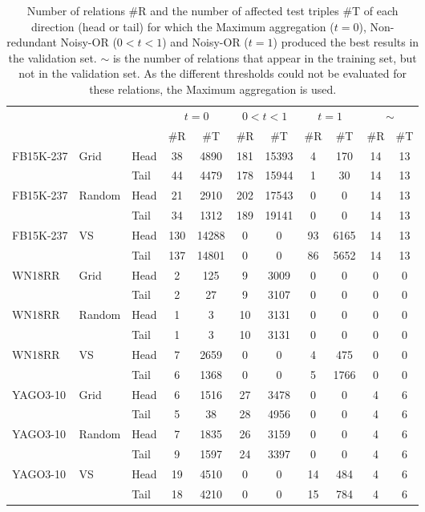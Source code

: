 \documentclass[akbc,twoside,11pt,lettersize]{article}
\begin{document}
\begin{table}[H]
    \centering
    \begin{tabular}{lllcccccccc}
    \hline
         & & & \multicolumn{2}{c}{$t=0$} & \multicolumn{2}{c}{$0 < t < 1$} & \multicolumn{2}{c}{$t=1$}  & \multicolumn{2}{c}{$\sim$}  \\
         & & & \#R & \#T & \#R & \#T & \#R & \#T & \#R & \#T \\ \hline
        FB15K-237 & Grid & Head & 38 & 4890 & 181 & 15393 & 4 & 170 & 14 & 13 \\
         & & Tail & 44 & 4479 & 178 & 15944 & 1 & 30 & 14 & 13 \\
        FB15K-237 & Random & Head & 21 & 2910 & 202 & 17543 & 0 & 0 & 14 & 13 \\
         & & Tail & 34 & 1312 & 189 & 19141 & 0 & 0 & 14 & 13 \\
        FB15K-237 & VS & Head & 130 & 14288 & 0 & 0 & 93 & 6165 & 14 & 13 \\
         & & Tail & 137 & 14801 & 0 & 0 & 86 & 5652 & 14 & 13 \\
        \hline
        WN18RR & Grid & Head & 2 & 125 & 9 & 3009 & 0 & 0 & 0 & 0 \\
         & & Tail & 2 & 27 & 9 & 3107 & 0 & 0 & 0 & 0 \\
        WN18RR & Random & Head & 1 & 3 & 10 & 3131 & 0 & 0 & 0 & 0 \\
         & & Tail & 1 & 3 & 10 & 3131 & 0 & 0 & 0 & 0 \\
        WN18RR & VS & Head & 7 & 2659 & 0 & 0 & 4 & 475 & 0 & 0 \\
         & & Tail & 6 & 1368 & 0 & 0 & 5 & 1766 & 0 & 0 \\
        \hline
        YAGO3-10 & Grid & Head & 6 & 1516 & 27 & 3478 & 0 & 0 & 4 & 6 \\
         & & Tail & 5 & 38 & 28 & 4956 & 0 & 0 & 4 & 6 \\
        YAGO3-10 & Random & Head & 7 & 1835 & 26 & 3159 & 0 & 0 & 4 & 6 \\
         & & Tail & 9 & 1597 & 24 & 3397 & 0 & 0 & 4 & 6 \\
        YAGO3-10 & VS & Head & 19 & 4510 & 0 & 0 & 14 & 484 & 4 & 6 \\
         & & Tail & 18 & 4210 & 0 & 0 & 15 & 784 & 4 & 6 \\
        \hline
    \end{tabular}
    \caption{ Number of relations \#R and the number of affected test triples \#T of each direction (head or tail) for which the Maximum aggregation ($t=0$), Non-redundant Noisy-OR ($0 < t < 1$) and Noisy-OR ($t = 1$) produced the best results in the validation set. $\sim$ is the number of relations that appear in the training set, but not in the validation set. As the different thresholds could not be evaluated for these relations, the Maximum aggregation is used. }
    \label{distribution}
\end{table}
\end{document}
